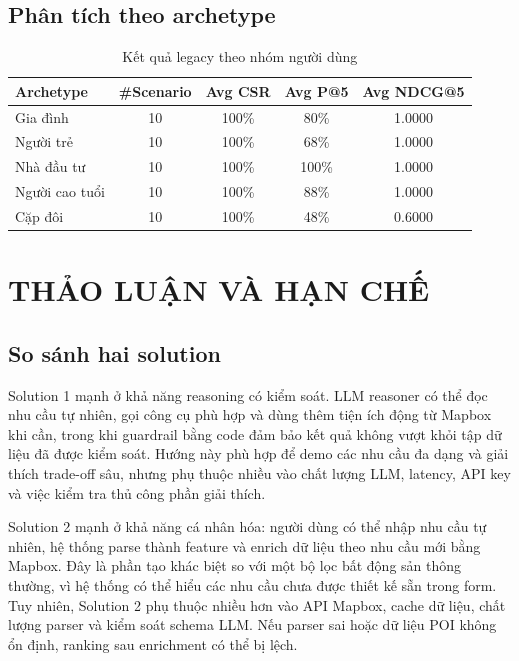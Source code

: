 \documentclass[a4paper,12pt]{article}
\begin{document}
\subsection{Phân tích theo archetype}
\begin{table}[H]
\centering
\caption{Kết quả legacy theo nhóm người dùng}
\label{tab:archetype_results}
\small
\begin{tabular}{|l|c|c|c|c|}
\hline
\textbf{Archetype} & \textbf{\#Scenario} & \textbf{Avg CSR} & \textbf{Avg P@5} & \textbf{Avg NDCG@5} \\ \hline
Gia đình & 10 & 100\% & 80\% & 1.0000 \\ \hline
Người trẻ & 10 & 100\% & 68\% & 1.0000 \\ \hline
Nhà đầu tư & 10 & 100\% & 100\% & 1.0000 \\ \hline
Người cao tuổi & 10 & 100\% & 88\% & 1.0000 \\ \hline
Cặp đôi & 10 & 100\% & 48\% & 0.6000 \\ \hline
\end{tabular}
\end{table}

\section{THẢO LUẬN VÀ HẠN CHẾ}

\subsection{So sánh hai solution}
Solution 1 mạnh ở khả năng reasoning có kiểm soát. LLM reasoner có thể đọc nhu cầu tự nhiên, gọi công cụ phù hợp và dùng thêm tiện ích động từ Mapbox khi cần, trong khi guardrail bằng code đảm bảo kết quả không vượt khỏi tập dữ liệu đã được kiểm soát. Hướng này phù hợp để demo các nhu cầu đa dạng và giải thích trade-off sâu, nhưng phụ thuộc nhiều vào chất lượng LLM, latency, API key và việc kiểm tra thủ công phần giải thích.

Solution 2 mạnh ở khả năng cá nhân hóa: người dùng có thể nhập nhu cầu tự nhiên, hệ thống parse thành feature và enrich dữ liệu theo nhu cầu mới bằng Mapbox. Đây là phần tạo khác biệt so với một bộ lọc bất động sản thông thường, vì hệ thống có thể hiểu các nhu cầu chưa được thiết kế sẵn trong form. Tuy nhiên, Solution 2 phụ thuộc nhiều hơn vào API Mapbox, cache dữ liệu, chất lượng parser và kiểm soát schema LLM. Nếu parser sai hoặc dữ liệu POI không ổn định, ranking sau enrichment có thể bị lệch.
\end{document}
